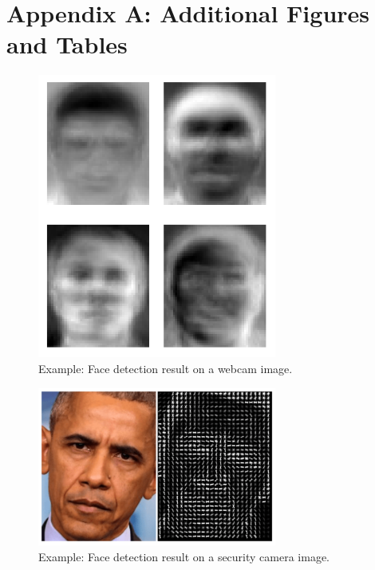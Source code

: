\section*{Appendix A: Additional Figures and Tables}


\begin{figure}[ht!]
    \centering
    \includegraphics[width=0.7\textwidth]{../Files/eigenfaces.png}
    \caption{Example: Face detection result on a webcam image.}
    \label{fig:webcam-example}
\end{figure}

\begin{figure}[ht!]
    \centering
    \includegraphics[width=0.7\textwidth]{../Files/histagram_of_oriented_gradients.png}
    \caption{Example: Face detection result on a security camera image.}
    \label{fig:seccam-example}
\end{figure}

